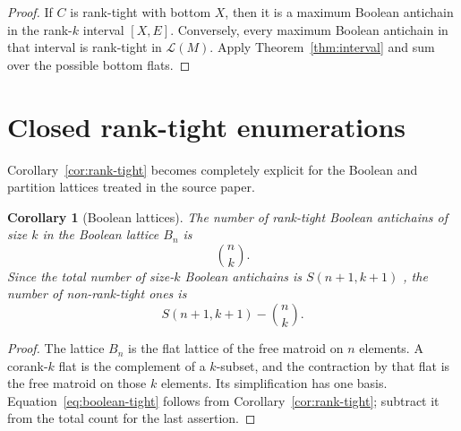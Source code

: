 \documentclass[11pt]{article}
\newtheorem{corollary}[theorem]{Corollary}
\theoremstyle{definition}
\theoremstyle{remark}
\newcommand{\cL}{\mathcal L}
\begin{document}
\begin{proof}
If $C$ is rank-tight with bottom $X$, then it is a maximum Boolean antichain
in the rank-$k$ interval $[X,E]$.  Conversely, every maximum Boolean
antichain in that interval is rank-tight in $\cL(M)$.
Apply
Theorem~\ref{thm:interval} and sum over the possible bottom flats.
\end{proof}

\section{Closed rank-tight enumerations}

Corollary~\ref{cor:rank-tight} becomes completely explicit for the Boolean
and partition lattices treated in the source paper.

\begin{corollary}[Boolean lattices]\label{cor:boolean-lattice}
The number of rank-tight Boolean antichains of size $k$ in the Boolean
lattice $B_n$ is
\begin{equation}\label{eq:boolean-tight}
 \binom nk.
\end{equation}
Since the total number of size-$k$ Boolean antichains is
$S(n+1,k+1)$ \cite{GarberEtAl2026},
the number of non-rank-tight ones is
\begin{equation}\label{eq:boolean-nontight}
 S(n+1,k+1)-\binom nk.
\end{equation}
\end{corollary}

\begin{proof}
The lattice $B_n$ is the flat lattice of the free matroid on $n$ elements.
A corank-$k$ flat is the complement of a $k$-subset, and the contraction by
that flat is the free matroid on those $k$ elements.  Its simplification has
one basis.  Equation~\eqref{eq:boolean-tight} follows from
Corollary~\ref{cor:rank-tight};
subtract it from the total count for the last
assertion.
\end{proof}
\end{document}
